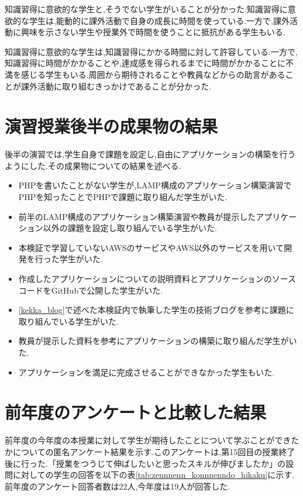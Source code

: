\documentclass[11pt, a4paper]{jreport}
\begin{document}
知識習得に意欲的な学生と,そうでない学生がいることが分かった.知識習得に意欲的な学生は,能動的に課外活動で自身の成長に時間を使っている.一方で,課外活動に興味を示さない学生や授業外で時間を使うことに抵抗がある学生もいる.

知識習得に意欲的な学生は,知識習得にかかる時間に対して許容している.一方で,知識習得に時間がかかることや,達成感を得られるまでに時間がかかることに不満を感じる学生もいる.周囲から期待されることや教員などからの助言があることが課外活動に取り組むきっかけであることが分かった.

\section{演習授業後半の成果物の結果}

後半の演習では,学生自身で課題を設定し,自由にアプリケーションの構築を行うようにした.その成果物についての結果を述べる.

\begin{itemize}
\item PHPを書いたことがない学生が,LAMP構成のアプリケーション構築演習でPHPを知ったことでPHPで課題に取り組んだ学生がいた.
\item 前半のLAMP構成のアプリケーション構築演習や教員が提示したアプリケーション以外の課題を設定し取り組んでいる学生がいた.
\item 本検証で学習していないAWSのサービスやAWS以外のサービスを用いて開発を行った学生がいた.
\item 作成したアプリケーションについての説明資料とアプリケーションのソースコードをGitHubで公開した学生がいた.
\item \ref{kekka_blog}で述べた本検証内で執筆した学生の技術ブログを参考に課題に取り組んでいる学生がいた.
\item 教員が提示した資料を参考にアプリケーションの構築に取り組んだ学生がいた.
\item アプリケーションを満足に完成させることができなかった学生もいた.
\end{itemize}

\section{前年度のアンケートと比較した結果}

前年度の今年度の本授業に対して学生が期待したことについて学ぶことができたかについての匿名アンケート結果を示す.このアンケートは,第15回目の授業終了後に行った.「授業をつうじて伸ばしたいと思ったスキルが伸びましたか」の設問に対しての学生の回答を以下の表\ref{tab:zennnenn_konnnenndo_hikaku}に示す.前年度のアンケート回答者数は22人,今年度は19人が回答した.
\end{document}
